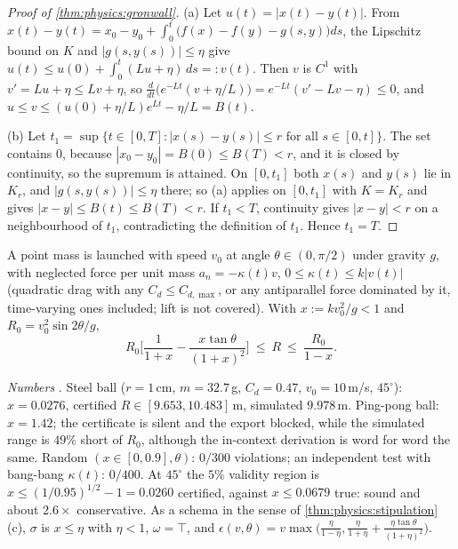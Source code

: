 \begin{proof}[Proof of \cref{thm:physics:gronwall}]
(a) Let $u(t)=|x(t)-y(t)|$. From
$x(t)-y(t)=x_0-y_0+\int_0^t\big(f(x)-f(y)-g(s,y)\big)ds$, the Lipschitz bound on $K$ and
$|g(s,y(s))|\le\eta$ give $u(t)\le u(0)+\int_0^t(Lu+\eta)\,ds=:v(t)$. Then $v$ is $C^1$ with
$v'=Lu+\eta\le Lv+\eta$, so $\frac{d}{dt}\big(e^{-Lt}(v+\eta/L)\big)=e^{-Lt}(v'-Lv-\eta)\le0$,
and $u\le v\le(u(0)+\eta/L)e^{Lt}-\eta/L=B(t)$.

(b) Let $t_1=\sup\{t\in[0,T]:|x(s)-y(s)|\le r\text{ for all }s\in[0,t]\}$. The set contains
$0$, because $|x_0-y_0|=B(0)\le B(T)<r$, and it is closed by continuity, so the supremum is
attained. On $[0,t_1]$ both $x(s)$ and $y(s)$ lie in $K_r$, and $|g(s,y(s))|\le\eta$ there;
so (a) applies on $[0,t_1]$ with $K=K_r$ and gives $|x-y|\le B(t)\le B(T)<r$. If $t_1<T$,
continuity gives $|x-y|<r$ on a neighbourhood of $t_1$, contradicting the definition of
$t_1$. Hence $t_1=T$.
\end{proof}

\begin{theorem}\label{thm:physics:projectile}
A point mass is launched with speed $v_0$ at angle $\theta\in(0,\pi/2)$ under gravity $g$,
with neglected force per unit mass $a_n=-\kappa(t)v$, $0\le\kappa(t)\le k|v(t)|$ (quadratic
drag with any $C_d\le C_{d,\max}$, or any antiparallel force dominated by it, time-varying
ones included; lift is not covered). With $x:=kv_0^2/g<1$ and $R_0=v_0^2\sin2\theta/g$,
\[
R_0\Big[\frac1{1+x}-\frac{x\tan\theta}{(1+x)^2}\Big]\ \le\ R\ \le\ \frac{R_0}{1-x}.
\]
\end{theorem}

\emph{Numbers} . Steel ball ($r=1$\,cm, $m=32.7$\,g, $C_d=0.47$,
$v_0=10$\,m/s, $45^\circ$): $x=0.0276$, certified $R\in[9.653,10.483]$\,m, simulated $9.978$\,m.
Ping-pong ball: $x=1.42$; the certificate is silent and the export blocked, while the
simulated range is $49\%$ short of $R_0$, although the in-context derivation is word for
word the same. Random $(x\in[0,0.9],\theta)$: $0/300$ violations; an independent test with
bang-bang $\kappa(t)$: $0/400$. At $45^\circ$ the $5\%$ validity region is $x\le(1/0.95)^{1/2}-1=0.0260$
certified, against $x\le0.0679$ true: sound and about $2.6\times$ conservative.
As a schema in the sense of \cref{thm:physics:stipulation}(c), $\sigma$ is $x\le\eta$ with
$\eta<1$, $\omega=\top$, and
$\epsilon(v,\theta)=v\max\big(\frac\eta{1-\eta},\frac\eta{1+\eta}+\frac{\eta\tan\theta}{(1+\eta)^2}\big)$.

